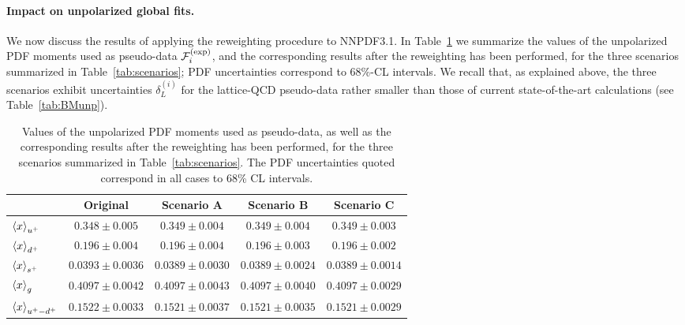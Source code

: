 \paragraph{Impact on unpolarized global fits.}
\label{subsec:upolfits}
%
We now discuss the results of applying the reweighting procedure to NNPDF3.1.
%
In Table~\ref{tab:unpolmomentsrw} we summarize
the values of the unpolarized PDF moments
used as pseudo-data $\mathcal{F}_i^{(\rm exp)}$,
and the corresponding results
after the reweighting has been performed, for the
three scenarios summarized 
in Table~\ref{tab:scenarios};
PDF uncertainties correspond to 68\%-CL intervals.
%
We recall that, as explained above, the three scenarios exhibit
uncertainties $\delta_L^{(i)}$ for the lattice-QCD pseudo-data rather smaller
than those of current state-of-the-art
calculations (see Table~\ref{tab:BMunp}).

\begin{table}[!t]
\centering
\footnotesize
\renewcommand{\arraystretch}{1.4} 
\begin{tabular}{lcccc}
\toprule 
&  Original  & Scenario A  &  Scenario B  &  Scenario C  \\
\midrule
$\left\langle x\right\rangle_{u^+}$     
& $0.348 \pm 0.005$ 
& $0.349 \pm 0.004$ 
& $0.349 \pm 0.004$ 
& $0.349 \pm 0.003$ \\
$\left\langle x\right\rangle_{d^+}$     
& $0.196 \pm 0.004$     
& $0.196 \pm 0.004$       
& $0.196 \pm 0.003$ 
& $0.196 \pm 0.002$ \\
$\left\langle x\right\rangle_{s^+}$     
& $0.0393 \pm 0.0036$   
& $0.0389 \pm 0.0030$   
& $0.0389 \pm 0.0024$   
& $0.0389 \pm 0.0014$  \\
$\left\langle x\right\rangle_{g}$       
& $0.4097 \pm 0.0042$    
& $0.4097 \pm 0.0043$    
& $0.4097 \pm 0.0040$ 
& $0.4097 \pm 0.0029$  \\
$\left\langle x\right\rangle_{u^+-d^+}$  
& $0.1522 \pm 0.0033$   
& $0.1521 \pm 0.0037$   
& $0.1521 \pm 0.0035$ 
& $0.1521 \pm 0.0029$ \\
\bottomrule
\end{tabular}
\caption{\small Values of the unpolarized PDF moments
  used as pseudo-data, as well as the corresponding results
  after the reweighting has been performed, for the
  three scenarios summarized 
  in Table~\ref{tab:scenarios}.
  The PDF uncertainties quoted correspond in all cases to 68\% CL intervals.
\label{tab:unpolmomentsrw}}
\end{table}

